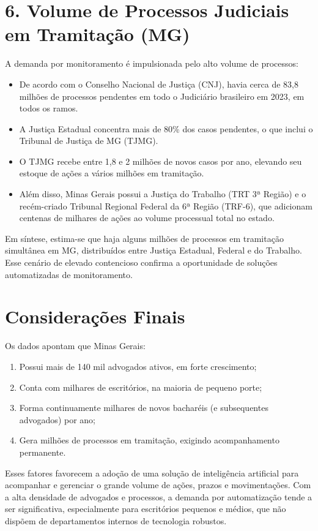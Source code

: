 \documentclass{article}
\begin{document}
\section{6. Volume de Processos Judiciais em Tramitação (MG)}
A demanda por monitoramento é impulsionada pelo alto volume de processos:
\begin{itemize}
\item De acordo com o Conselho Nacional de Justiça (CNJ), havia cerca de 83,8 milhões de processos pendentes em todo o Judiciário brasileiro em 2023, em todos os ramos.
\item A Justiça Estadual concentra mais de 80\% dos casos pendentes, o que inclui o Tribunal de Justiça de MG (TJMG).
\item O TJMG recebe entre 1,8 e 2 milhões de novos casos por ano, elevando seu estoque de ações a vários milhões em tramitação.
\item Além disso, Minas Gerais possui a Justiça do Trabalho (TRT 3ª Região) e o recém-criado Tribunal Regional Federal da 6ª Região (TRF-6), que adicionam centenas de milhares de ações ao volume processual total no estado.
\end{itemize}

Em síntese, estima-se que haja alguns milhões de processos em tramitação simultânea em MG, distribuídos entre Justiça Estadual, Federal e do Trabalho. Esse cenário de elevado contencioso confirma a oportunidade de soluções automatizadas de monitoramento.

\section{Considerações Finais}
Os dados apontam que Minas Gerais:
\begin{enumerate}
\item Possui mais de 140 mil advogados ativos, em forte crescimento;
\item Conta com milhares de escritórios, na maioria de pequeno porte;
\item Forma continuamente milhares de novos bacharéis (e subsequentes advogados) por ano;
\item Gera milhões de processos em tramitação, exigindo acompanhamento permanente.
\end{enumerate}

Esses fatores favorecem a adoção de uma solução de inteligência artificial para acompanhar e gerenciar o grande volume de ações, prazos e movimentações. Com a alta densidade de advogados e processos, a demanda por automatização tende a ser significativa, especialmente para escritórios pequenos e médios, que não dispõem de departamentos internos de tecnologia robustos.
\end{document}
